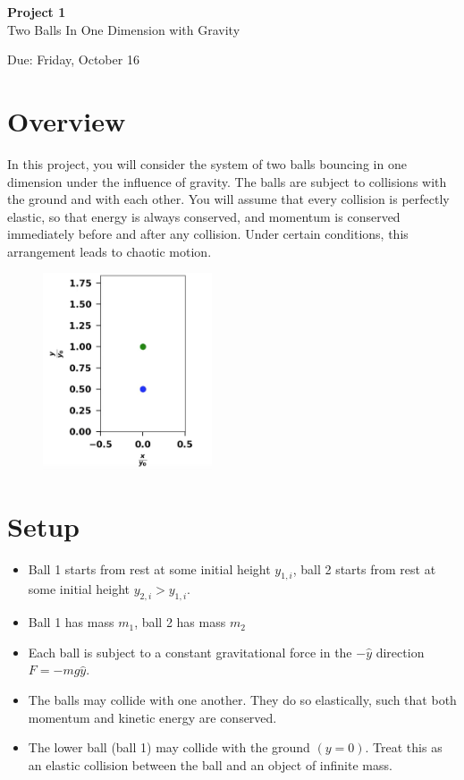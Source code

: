 \documentclass{article}
\begin{document}
\fancyfoot[C]{\thepage}
\vspace*{0cm}
\begin{center}
	{\LARGE \textbf{Project 1}}\\
	\vspace{0.25cm}
	{\Large Two Balls In One Dimension with Gravity}
	
	{\Large Due: Friday, October 16}
\end{center}

\newcommand{\textbook}{\textit{Giordano}}

\section*{Overview}
In this project, you will consider the system of two balls bouncing in one dimension under the influence of gravity. The balls are subject to collisions with the ground and with each other. You will assume that every collision is perfectly elastic, so that energy is always conserved, and momentum is conserved immediately before and after any collision. Under certain conditions, this arrangement leads to chaotic motion.

\begin{figure}[ht]
	\centering
	\includegraphics[width=5cm]{screen_grab.png}
\end{figure}

\section*{Setup}
\begin{itemize}
	\item Ball 1 starts from rest at some initial height $y_{1,i}$, ball 2 starts from rest at some initial height $y_{2,i}>y_{1,i}$.
	\item Ball 1 has mass $m_1$, ball 2 has mass $m_2$
	\item Each ball is subject to a constant gravitational force in the $-\hat{y}$ direction $F=-mg\hat{y}$.
	\item The balls may collide with one another. They do so elastically, such that both momentum and kinetic energy are conserved.
	\item The lower ball (ball 1) may collide with the ground $(y=0)$. Treat this as an elastic collision between the ball and an object of infinite mass.
\end{itemize}
\end{document}
